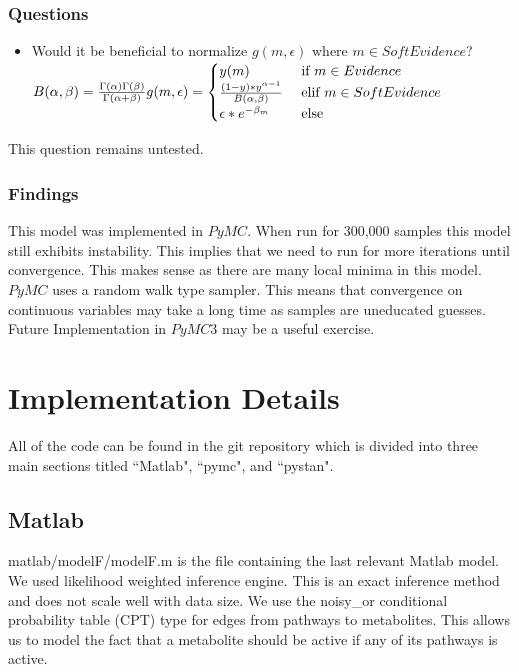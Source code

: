 \documentclass[11pt]{article}
\begin{document}
\subsubsection{Questions}
\begin{itemize}
    \item Would it be beneficial to normalize $g(m, \epsilon) \text{ where } m \in SoftEvidence$? \\
    $B(\alpha, \beta) = \frac{\Gamma(\alpha) \Gamma(\beta)}{\Gamma(\alpha + \beta)} \\
    g(m,\epsilon) = \begin{cases}
 y(m) & \text{ if } m \in Evidence \\ 
 \frac{(1 - y) * y ^ {\alpha - 1}}{B(\alpha, \beta)} &\text{ elif } m \in SoftEvidence\\
 \epsilon * e ^ {-\beta_m}& \text{ else}
\end{cases}$\\
\end{itemize}
This question remains untested.

\subsubsection{Findings}

This model was implemented in $PyMC$. When run for 300,000 samples this model still exhibits instability. This implies that we need to run for more iterations until convergence. This makes sense as there are many local minima in this model. $PyMC$ uses a random walk type sampler. This means that convergence on continuous variables may take a long time as samples are uneducated guesses. Future Implementation in $PyMC3$ may be a useful exercise. 

\section{Implementation Details}

All of the code can be found in the git repository which is divided into three main sections titled ``Matlab", ``pymc", and ``pystan". 

\subsection{Matlab}
matlab/modelF/modelF.m is the file containing the last relevant Matlab model. We used likelihood weighted inference engine. This is an exact inference method and does not scale well with data size. We use the noisy\_or conditional probability table (CPT) type for edges from pathways to metabolites. This allows us to model the fact that a metabolite should be active if any of its pathways is active. 
\end{document}
